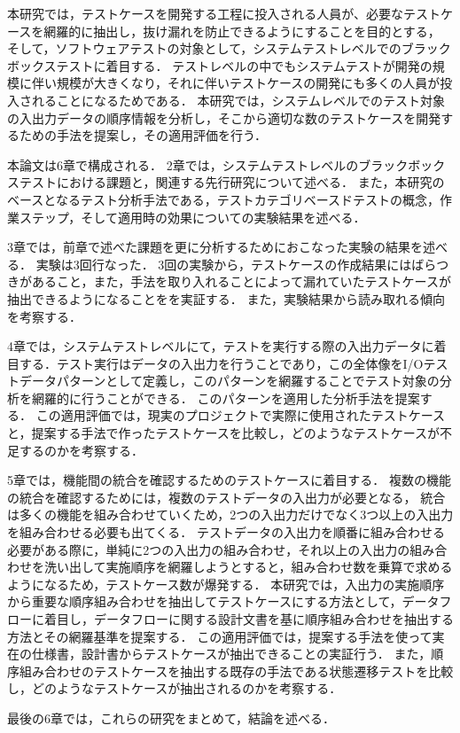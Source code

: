 本研究では，テストケースを開発する工程に投入される人員が、必要なテストケースを網羅的に抽出し，抜け漏れを防止できるようにすることを目的とする，
そして，ソフトウェアテストの対象として，システムテストレベルでのブラックボックステストに着目する．
テストレベルの中でもシステムテストが開発の規模に伴い規模が大きくなり，それに伴いテストケースの開発にも多くの人員が投入されることになるためである．
本研究では，システムレベルでのテスト対象の入出力データの順序情報を分析し，そこから適切な数のテストケースを開発するための手法を提案し，その適用評価を行う．

本論文は6章で構成される．
2章では，システムテストレベルのブラックボックステストにおける課題と，関連する先行研究について述べる．
また，本研究のベースとなるテスト分析手法である，テストカテゴリベースドテストの概念，作業ステップ，そして適用時の効果についての実験結果を述べる．

3章では，前章で述べた課題を更に分析するためにおこなった実験の結果を述べる．
実験は3回行なった．
3回の実験から，テストケースの作成結果にはばらつきがあること，また，手法を取り入れることによって漏れていたテストケースが抽出できるようになることをを実証する．
また，実験結果から読み取れる傾向を考察する．

4章では，システムテストレベルにて，テストを実行する際の入出力データに着目する．テスト実行はデータの入出力を行うことであり，この全体像をI/Oテストデータパターンとして定義し，このパターンを網羅することでテスト対象の分析を網羅的に行うことができる．
このパターンを適用した分析手法を提案する．
この適用評価では，現実のプロジェクトで実際に使用されたテストケースと，提案する手法で作ったテストケースを比較し，どのようなテストケースが不足するのかを考察する．

5章では，機能間の統合を確認するためのテストケースに着目する．
複数の機能の統合を確認するためには，複数のテストデータの入出力が必要となる，
統合は多くの機能を組み合わせていくため，2つの入出力だけでなく3つ以上の入出力を組み合わせる必要も出てくる．
テストデータの入出力を順番に組み合わせる必要がある際に，単純に2つの入出力の組み合わせ，それ以上の入出力の組み合わせを洗い出して実施順序を網羅しようとすると，組み合わせ数を乗算で求めるようになるため，テストケース数が爆発する．
本研究では，入出力の実施順序から重要な順序組み合わせを抽出してテストケースにする方法として，データフローに着目し，データフローに関する設計文書を基に順序組み合わせを抽出する方法とその網羅基準を提案する．
この適用評価では，提案する手法を使って実在の仕様書，設計書からテストケースが抽出できることの実証行う．
また，順序組み合わせのテストケースを抽出する既存の手法である状態遷移テストを比較し，どのようなテストケースが抽出されるのかを考察する．

最後の6章では，これらの研究をまとめて，結論を述べる．
